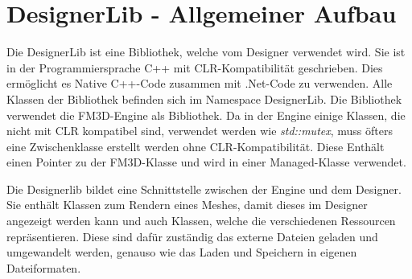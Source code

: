 \section{DesignerLib - Allgemeiner Aufbau}

Die DesignerLib ist eine Bibliothek, welche vom Designer verwendet wird. Sie ist in der Programmiersprache C++ mit \ac{CLR}-Kompatibilität geschrieben. Dies ermöglicht es Native C++-Code zusammen mit .Net-Code zu verwenden. Alle Klassen der Bibliothek befinden sich im Namespace DesignerLib. Die Bibliothek verwendet die FM3D-Engine als Bibliothek. Da in der Engine einige Klassen, die nicht mit \ac{CLR} kompatibel sind, verwendet werden wie \textit{std::mutex}, muss öfters eine Zwischenklasse erstellt werden ohne \ac{CLR}-Kompatibilität. Diese Enthält einen Pointer zu der FM3D-Klasse und wird in einer Managed-Klasse verwendet.

Die Designerlib bildet eine Schnittstelle zwischen der Engine und dem Designer. Sie enthält Klassen zum Rendern eines Meshes, damit dieses im Designer angezeigt werden kann und auch Klassen, welche die verschiedenen Ressourcen repräsentieren. Diese sind dafür zuständig das externe Dateien geladen und umgewandelt werden, genauso wie das Laden und Speichern in eigenen Dateiformaten. 